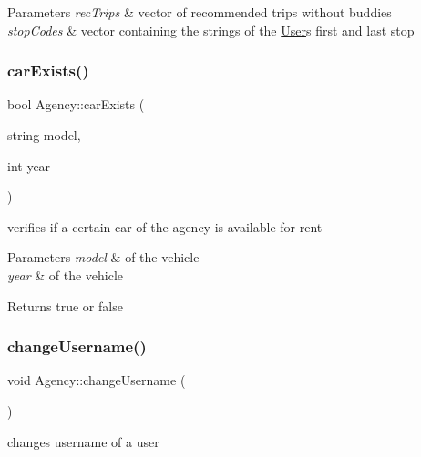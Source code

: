 \begin{DoxyParams}{Parameters}
{\em rec\+Trips} & vector of recommended trips without buddies \\
\hline
{\em stop\+Codes} & vector containing the strings of the \hyperlink{class_user}{User}\textquotesingle{}s first and last stop \\
\hline
\end{DoxyParams}
\mbox{\label{group___agency_ga3332e859279fb7f7ff27916c4b6b6ca3}} 
\subsubsection{\texorpdfstring{car\+Exists()}{carExists()}}
{\footnotesize\ttfamily bool Agency\+::car\+Exists (\begin{DoxyParamCaption}\item[{string}]{model,  }\item[{int}]{year }\end{DoxyParamCaption})}



verifies if a certain car of the agency is available for rent 


\begin{DoxyParams}{Parameters}
{\em model} & of the vehicle \\
\hline
{\em year} & of the vehicle\\
\hline
\end{DoxyParams}
\begin{DoxyReturn}{Returns}
true or false 
\end{DoxyReturn}
\mbox{\label{group___agency_ga8a2b0d746484213d43f722c0a0766a66}} 
\subsubsection{\texorpdfstring{change\+Username()}{changeUsername()}}
{\footnotesize\ttfamily void Agency\+::change\+Username (\begin{DoxyParamCaption}{ }\end{DoxyParamCaption})}



changes username of a user 

